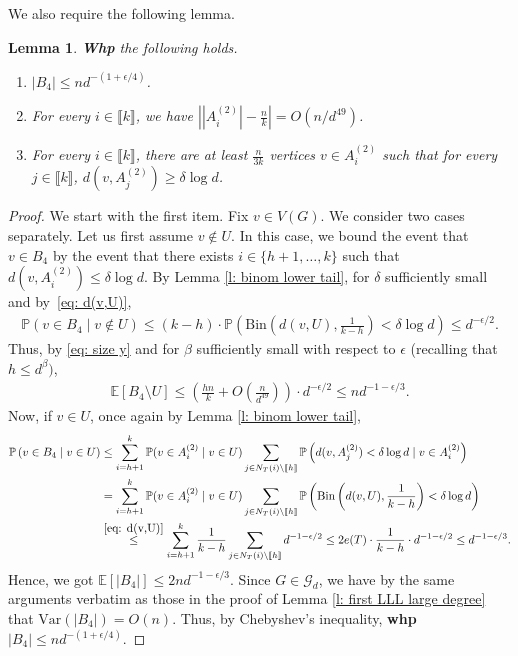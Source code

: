 \documentclass[notitlepage]{scrartcl}
\newcommand{\br}[1]{\llbracket{#1}\rrbracket}
\newtheorem{lemma}[thm]{Lemma}
\renewcommand{\Pr}{\mathbb{P}}
\begin{document}
We also require the following lemma.
\begin{lemma}\label{l: typical tilde a}
\textbf{Whp} the following holds.
    \begin{enumerate}
        \item $|B_4| \le n d^{-(1 + \epsilon/4)}$.
        \item For every $i\in \br{k}$, we have $\left||A_{i}^{(2)}|-\frac{n}{k}\right|=O(n/d^{49})$.
        \item For every $i\in \br{k}$, there are at least $\frac{n}{3k}$ vertices $v\in A_i^{(2)}$ such that for every $j\in \br{k}$, $d(v,A_j^{(2)})\ge \delta\log d$.  
    \end{enumerate}
\end{lemma}
\begin{proof}
    We start with the first item. Fix $v \in V(G)$. We consider two cases separately. Let us first assume $v\notin U$. In this case, we bound the event that $v \in B_4$ by the event that there exists $i \in \{h+1, \ldots, k\}$ such that $d(v, A_i^{(2)}) \le \delta \log d$. By Lemma \ref{l: binom lower tail}, for $\delta$ sufficiently small and by~\eqref{eq: d(v,U)},
    \begin{align}
        \Pr\left(v \in B_4 \mid v \notin U\right) \le (k-h) \cdot \Pr\left(\text{Bin}\left(d(v, U), \frac{1}{k-h}\right) < \delta \log d\right) \le d^{-\epsilon/2}. \label{eq: b4 not u}
    \end{align}
    Thus, by \eqref{eq: size y} and for $\beta$ sufficiently small with respect to $\epsilon$ (recalling that $h\le d^{\beta})$, 
    \begin{align*}
        \mathbb{E}[B_4 \setminus U] \le \left(\frac{hn}{k} + O\left(\frac{n}{d^{49}}\right)\right) \cdot d^{-\epsilon/2} \le n d^{-1 - \epsilon/3}.
    \end{align*}
    Now, if $v\in U$, once again by Lemma \ref{l: binom lower tail}, 
    \begin{align*}
        \Pr\left(v \in B_4 \mid v \in U\right) &\le \sum_{i = h+1}^{k} \Pr(v \in A_i^{(2)}\mid v\in U) \sum_{j \in N_T(i) \setminus \br{h}} \Pr\left(d(v, A_j^{(2)}) < \delta \log d \mid v \in A_i^{(2)}\right)
        \\&= \sum_{i = h+1}^{k} \Pr(v \in A_i^{(2)}\mid v\in U) \sum_{j \in N_T(i) \setminus \br{h}} \Pr\left(\text{Bin}\left(d(v, U), \frac{1}{k-h}\right) < \delta \log d\right) \\
        &\stackrel{\eqref{eq: d(v,U)}}\le \sum_{i = h+1}^{k} \frac{1}{k - h} \sum_{j \in N_T(i) \setminus \br{h}} d^{-1 - \epsilon/2} \le 2e(T) \cdot \frac{1}{k-h} \cdot d^{-1 - \epsilon/2} \le d^{-1 - \epsilon/3}.
    \end{align*}
    Hence, we got $\mathbb{E}[|B_4|] \le 2n d^{-1-\epsilon/3}$. Since $G\in \mathcal{G}_d$, we have by the same arguments verbatim as those in the proof of Lemma \ref{l: first LLL large degree} that $\text{Var}(|B_4|) = O(n)$. Thus, by Chebyshev's inequality, \textbf{whp} $|B_4|\le nd^{-(1+\epsilon/4)}$.
    


\end{proof}
\end{document}
